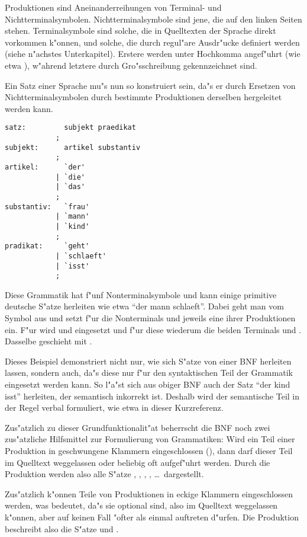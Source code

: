 Produktionen sind Aneinanderreihungen von Terminal- und
Nichtterminalsymbolen. Nichtterminalsymbole sind jene, die auf
den linken Seiten stehen. Terminalsymbole sind solche, die in
Quelltexten der Sprache direkt vorkommen k"onnen, und solche,
die durch regul"are Ausdr"ucke definiert werden (siehe n"achstes
Unterkapitel). Erstere werden unter Hochkomma angef"uhrt (wie
etwa ), w"ahrend letztere durch Gro"sschreibung
gekennzeichnet sind.

Ein Satz einer Sprache mu"s nun so konstruiert sein, da"s er
durch Ersetzen von Nichtterminalsymbolen durch bestimmte Produktionen
derselben hergeleitet werden kann.

\newpage
\example
\begin{verbatim}
satz:         subjekt praedikat
            ;
subjekt:      artikel substantiv
            ;
artikel:      `der'
            | `die'
            | `das'
            ;
substantiv:   `frau'
            | `mann'
            | `kind'
            ;
pradikat:     `geht'
            | `schlaeft'
            | `isst'
            ;
\end{verbatim}

Diese Grammatik hat f"unf Nonterminalsymbole und kann einige
primitive deutsche S"atze herleiten wie etwa "`der mann
schlaeft"'. Dabei geht man vom Symbol  aus und setzt
f"ur die Nonterminals  und  jeweils
eine ihrer Produktionen ein. F"ur  wird 
und  eingesetzt und f"ur diese wiederum die beiden
Terminals  und . Dasselbe geschieht mit
.

Dieses Beispiel demonstriert nicht nur, wie sich S"atze von einer
BNF herleiten lassen, sondern auch, da"s diese nur f"ur den
syntaktischen Teil der Grammatik eingesetzt werden kann. So
l"a"st sich aus obiger BNF auch der Satz "`der kind isst"'
herleiten, der semantisch inkorrekt ist. Deshalb wird der
semantische
Teil in der Regel verbal formuliert, wie etwa in
dieser Kurzreferenz.

Zus"atzlich zu dieser Grundfunktionalit"at beherrscht die BNF
noch zwei zus"atzliche Hilfsmittel zur Formulierung von
Grammatiken: Wird ein Teil einer Produktion in geschwungene Klammern
eingeschlossen (\fu{\{\}}), dann darf dieser Teil im Quelltext
weggelassen oder beliebig oft aufgef"uhrt werden. Durch die Produktion
 werden also alle S"atze ,
, , , \ldots\ dargestellt.

Zus"atzlich k"onnen Teile von Produktionen in eckige Klammern
eingeschlossen werden, was bedeutet, da"s sie optional sind, also
im Quelltext weggelassen k"onnen, aber auf keinen Fall "ofter als
einmal auftreten d"urfen. Die Produktion 
beschreibt also die S"atze  und .


